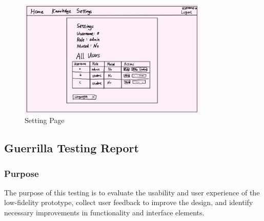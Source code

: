\documentclass[12pt]{article}
\begin{document}
    \begin{figure}[H]
        \centering
        \includegraphics[width=0.8\textwidth]{graphs/setting_page.jpg}
        \caption{Setting Page}
        \label{Setting Page}
    \end{figure}



\subsection{Guerrilla Testing Report}

    \subsubsection*{Purpose} 
    \hspace{2em}The purpose of this testing is to evaluate the usability and user experience of the low-fidelity prototype, collect user feedback to improve the design, and identify necessary improvements in functionality and interface elements.
\end{document}
